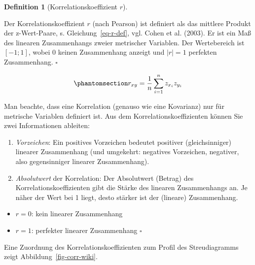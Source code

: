 \documentclass[
  letterpaper,
  oneside,
  open=any]{scrbook}
\providecommand{\tightlist}{%
  \setlength{\itemsep}{0pt}\setlength{\parskip}{0pt}}\usepackage{longtable,booktabs,array}
\theoremstyle{definition}
\theoremstyle{definition}
\theoremstyle{definition}
\newtheorem{definition}{Definition}[chapter]
\theoremstyle{remark}
\begin{document}
\begin{definition}[Korrelationskoeffizient
\(r\)]\protect\hypertarget{def-r}{}\label{def-r}

Der Korrelationskoeffizient \(r\) (nach Pearson) ist definiert als das
mittlere Produkt der z-Wert-Paare, s. Gleichung~\ref{eq-r-def}, vgl.
Cohen et al. (2003). Er ist ein Maß des linearen Zusammenhangs zweier
metrischer Variablen. Der Wertebereich ist \([-1;1]\), wobei 0 keinen
Zusammenhang anzeigt und \(|r|=1\) perfekten Zusammenhang. \(\square\)

\end{definition}

\begin{equation}\phantomsection\label{eq-r-def}{r_{xy}=\frac{1}{n}\sum_{i=1}^n z_{x_i} z_{y_i}}\end{equation}

Man beachte, dass eine Korrelation (genauso wie eine Kovarianz) nur für
metrische Variablen definiert ist. Aus dem Korrelationskoeffizienten
können Sie zwei Informationen ableiten:

\begin{enumerate}
\def\labelenumi{\arabic{enumi}.}
\tightlist
\item
  \emph{Vorzeichen}: Ein positives Vorzeichen bedeutet positiver
  (gleichsinniger) linearer Zusammenhang (und umgekehrt: negatives
  Vorzeichen, negativer, also gegensinniger linearer Zusammenhang).
\item
  \emph{Absolutwert} der Korrelation: Der Absolutwert (Betrag) des
  Korrelationskoeffizienten gibt die Stärke des linearen Zusammenhangs
  an. Je näher der Wert bei 1 liegt, desto stärker ist der (lineare)
  Zusammenhang.
\end{enumerate}

\begin{itemize}
\tightlist
\item
  \(r = 0\): kein linearer Zusammenhang
\item
  \(r = 1\): perfekter linearer Zusammenhang \(\square\)
\end{itemize}

Eine Zuordnung des Korrelationskoeffizienten zum Profil des
Streudiagramms zeigt Abbildung~\ref{fig-corr-wiki}.
\end{document}
